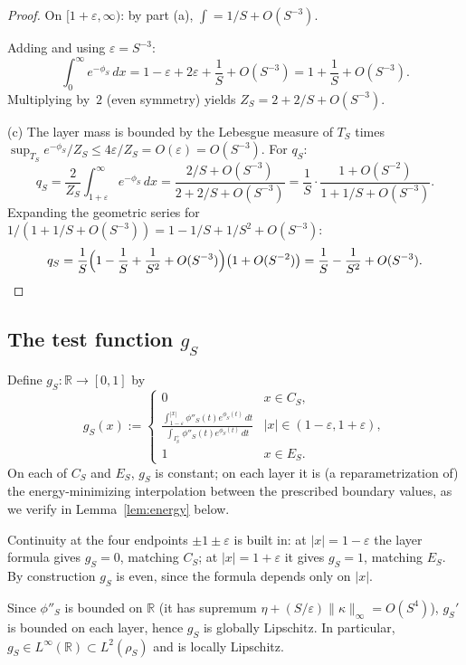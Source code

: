 \documentclass{article}
\theoremstyle{remark}
\begin{document}
\begin{proof}
On $[1+\varepsilon,\infty)$: by part (a), $\int=1/S+O(S^{-3})$.

Adding and using $\varepsilon=S^{-3}$:
\[
  \int_0^{\infty}e^{-\phi_S}\,dx
  =1-\varepsilon+2\varepsilon+\frac{1}{S}+O(S^{-3})
  =1+\frac{1}{S}+O(S^{-3}).
\]
Multiplying by~$2$ (even symmetry) yields $Z_S=2+2/S+O(S^{-3})$.

(c) The layer mass is bounded by the Lebesgue measure of $T_S$ times
$\sup_{T_S}e^{-\phi_S}/Z_S\le 4\varepsilon/Z_S=O(\varepsilon)=O(S^{-3})$. For
$q_S$:
\[
  q_S=\frac{2}{Z_S}\int_{1+\varepsilon}^{\infty}e^{-\phi_S}\,dx
  =\frac{2/S+O(S^{-3})}{2+2/S+O(S^{-3})}
  =\frac{1}{S}\cdot\frac{1+O(S^{-2})}{1+1/S+O(S^{-3})}.
\]
Expanding the geometric series for $1/(1+1/S+O(S^{-3}))=
1-1/S+1/S^2+O(S^{-3})$:
\[
  q_S=\frac{1}{S}\Bigl(1-\frac{1}{S}+\frac{1}{S^2}+O(S^{-3})\Bigr)\bigl(1+O(S^{-2})\bigr)
   =\frac{1}{S}-\frac{1}{S^2}+O(S^{-3}).\qedhere
\]
\end{proof}

\subsection*{The test function $g_S$}

Define $g_S:\mathbb R\to[0,1]$ by
\begin{equation}\label{eq:gS}
  g_S(x):=
  \begin{cases}
    0 & x\in C_S,\\[4pt]
    \displaystyle
      \frac{\int_{1-\varepsilon}^{|x|}\phi''_S(t)e^{\phi_S(t)}\,dt}
           {\int_{I_S^+}\phi''_S(t)e^{\phi_S(t)}\,dt}
      & |x|\in (1-\varepsilon,1+\varepsilon),\\[12pt]
    1 & x\in E_S.
  \end{cases}
\end{equation}
On each of $C_S$ and $E_S$, $g_S$ is constant; on each layer it is (a
reparametrization of) the energy-minimizing interpolation between the
prescribed boundary values, as we verify in Lemma~\ref{lem:energy} below.

Continuity at the four endpoints $\pm 1\pm\varepsilon$ is built in: at
$|x|=1-\varepsilon$ the layer formula gives $g_S=0$, matching $C_S$; at
$|x|=1+\varepsilon$ it gives $g_S=1$, matching $E_S$. By construction $g_S$
is even, since the formula depends only on $|x|$.

Since $\phi''_S$ is bounded on $\mathbb R$ (it has supremum $\eta+(S/\varepsilon)
\|\kappa\|_\infty=O(S^4)$), $g_S'$ is bounded on each layer, hence $g_S$ is
globally Lipschitz. In particular, $g_S\in L^\infty(\mathbb R)\subset
L^2(\rho_S)$ and is locally Lipschitz.
\end{document}

